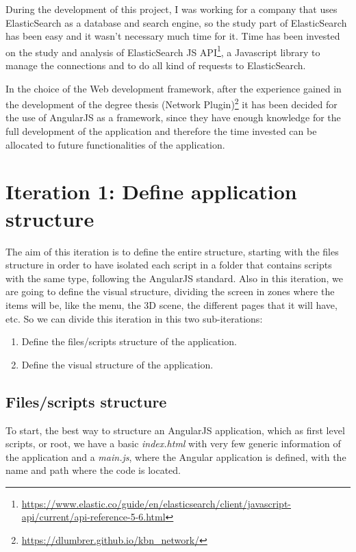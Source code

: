 \documentclass[a4paper, 12pt]{book}
\begin{document}
During the development of this project, I was working for a company that uses ElasticSearch as a database and search engine, so the study part of ElasticSearch has been easy and it wasn't necessary much time for it. Time has been invested on the study and analysis of ElasticSearch JS API\footnote{\url{https://www.elastic.co/guide/en/elasticsearch/client/javascript-api/current/api-reference-5-6.html}}, a Javascript library to manage the connections and to do all kind of requests to ElasticSearch.

In the choice of the Web development framework, after the experience gained in the development of the degree thesis (Network Plugin)\footnote{\url{https://dlumbrer.github.io/kbn_network/}} it has been decided for the use of AngularJS as a framework, since they have enough knowledge for the full development of the application and therefore the time invested can be allocated to future functionalities of the application.


\section{Iteration 1: Define application structure}
\label{sec:it1}

The aim of this iteration is to define the entire structure, starting with the files structure in order to have isolated each script in a folder that contains scripts with the same type, following the AngularJS standard. Also in this iteration, we are going to define the visual structure, dividing the screen in zones where the items will be, like the menu, the 3D scene, the different pages that it will have, etc.
So we can divide this iteration in this two sub-iterations:

\begin{enumerate}
\item Define the files/scripts structure of the application.
\item Define the visual structure of the application.
\end{enumerate}

\subsection{Files/scripts structure}

To start, the best way to structure an AngularJS application, which as first level scripts, or root, we have a basic \textit{index.html} with very few generic information of the application and a \textit{main.js}, where the Angular application is defined, with the name and path where the code is located.
\end{document}
